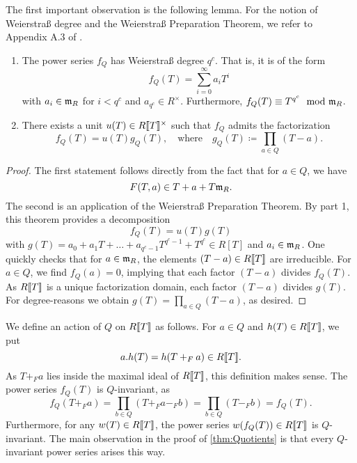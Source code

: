 \documentclass[../main.tex]{subfiles}
\begin{document}
The first important observation is the following lemma.
For the notion of Weierstraß degree and the Weierstraß Preparation Theorem, we refer
to Appendix A.3 of \cite{hazewinkel1978formal}.
\begin{lem}\label{lem:fQIsWeierstraß} \leavevmode
  \begin{enumerate}
    \item The power series $f_Q$ has Weierstraß degree $q^c$. That is, it is of
      the form 
      \begin{equation*} 
        f_Q(T) = \sum_{i=0}^\infty a_i T^i
      \end{equation*} 
      with $a_i \in \mathfrak{m}_R$ for $i < q^c$ and $a_{q^c} \in R^\times$. 
      Furthermore, $f_Q(T) \equiv T^{q^c} \mod {\mathfrak{m}}_R$. 
    \item There exists a unit $u(T) \in R\llbracket T \rrbracket^\times$ such that $f_Q$ admits
      the factorization
      \begin{equation*}
        f_Q(T) = u(T) g_Q(T),\quad \text{where} \quad 
        g_Q(T) \coloneqq \prod_{a \in Q} \left(T - a \right).
      \end{equation*}
  \end{enumerate}
\end{lem}
\begin{proof}
  The first statement follows directly from the fact that for $a \in Q$, we have
  \begin{equation*}
    F(T, a) \in T + a + T \mathfrak{m}_R.
  \end{equation*}
  The second is an application of the Weierstraß Preparation Theorem. By part
  1, this theorem provides a decomposition
  \begin{equation*}
    f_Q(T) = u(T)  g(T)
  \end{equation*}
  with $g(T) = a_0 + a_1T + \dots + a_{q^c-1}T^{q^c-1} + T^{q^c} \in R[T]$ and
  $a_i \in \mathfrak{m}_R$. One quickly checks that for $a \in \mathfrak{m}_R$, the
  elements $(T-a) \in R\llbracket T \rrbracket$ are irreducible. For $a \in Q$, we find 
  $f_Q(a) = 0$, implying that each factor $(T-a)$ divides $f_Q(T)$. As 
  $R\llbracket T \rrbracket$ is a unique factorization domain, 
  each factor $(T-a)$ divides $g(T)$. For degree-reasons we obtain $g(T) =
  \prod_{a \in Q}\left(T-a \right)$, as desired.
\end{proof}

We define an action of $Q$ on $R\llbracket T \rrbracket$ as follows. For 
$a \in Q$ and $h(T) \in R\llbracket T \rrbracket$, we put
\begin{equation*}
  a.h(T) = h(T +_F a) \in R\llbracket T \rrbracket.
\end{equation*}
As $T +_F a$ lies inside the maximal ideal of $R\llbracket T \rrbracket$, this definition
makes sense. The power series $f_Q(T)$ is $Q$-invariant, as
\begin{equation*}
  f_Q(T+_F a)  = \prod_{b \in Q}\left(T +_F a -_F b \right) 
  = \prod_{b \in Q}\left(T -_F b \right) = f_Q(T).
\end{equation*}
Furthermore, for any $w(T) \in R\llbracket T \rrbracket$, the power series
$w(f_Q(T)) \in R\llbracket T \rrbracket$ is $Q$-invariant.
The main observation in the proof of \cref{thm:Quotients} is
that every $Q$-invariant power series arises this way.
\end{document}
